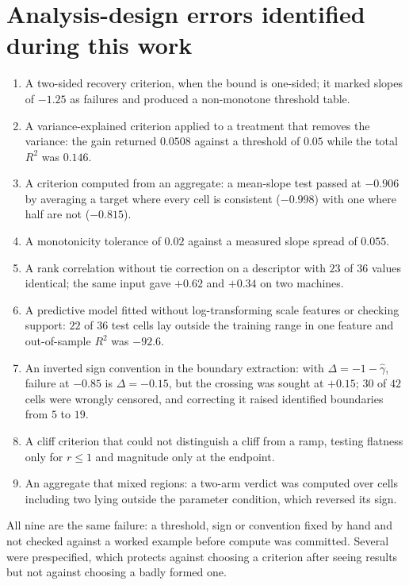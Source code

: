 \documentclass[sn-mathphys-num]{sn-jnl}
\theoremstyle{plain}
\theoremstyle{remark}
\begin{document}
\section{Analysis-design errors identified during this work}\label{S2}


\begin{enumerate}
\item A two-sided recovery criterion, when the bound is one-sided; it marked slopes of $-1.25$ as failures and produced a non-monotone threshold table.
\item A variance-explained criterion applied to a treatment that removes the variance: the gain returned $0.0508$ against a threshold of $0.05$ while the total $R^2$ was $0.146$.
\item A criterion computed from an aggregate: a mean-slope test passed at $-0.906$ by averaging a target where every cell is consistent ($-0.998$) with one where half are not ($-0.815$).
\item A monotonicity tolerance of $0.02$ against a measured slope spread of $0.055$.
\item A rank correlation without tie correction on a descriptor with $23$ of $36$ values identical; the same input gave $+0.62$ and $+0.34$ on two machines.
\item A predictive model fitted without log-transforming scale features or checking support: $22$ of $36$ test cells lay outside the training range in one feature and out-of-sample $R^2$ was $-92.6$.
\item An inverted sign convention in the boundary extraction: with $\Delta=-1-\hat\gamma$, failure at $-0.85$ is $\Delta=-0.15$, but the crossing was sought at $+0.15$; $30$ of $42$ cells were wrongly censored, and correcting it raised identified boundaries from $5$ to $19$.
\item A cliff criterion that could not distinguish a cliff from a ramp, testing flatness only for $r\le1$ and magnitude only at the endpoint.
\item An aggregate that mixed regions: a two-arm verdict was computed over cells including two lying outside the parameter condition, which reversed its sign.
\end{enumerate}

All nine are the same failure: a threshold, sign or convention fixed by hand and not checked against a worked example before compute was committed. Several were prespecified, which protects against choosing a criterion after seeing results but not against choosing a badly formed one.
\end{document}
